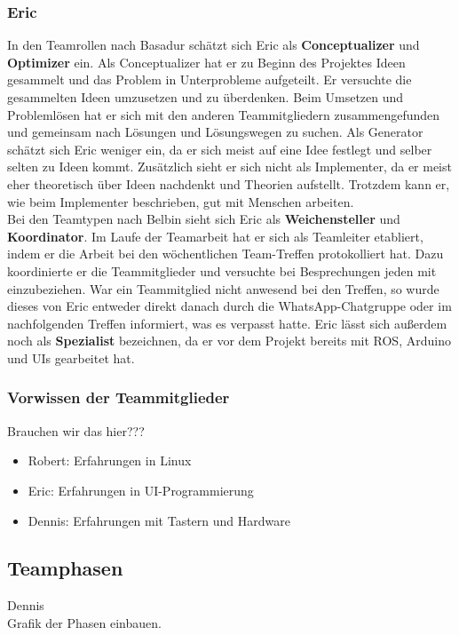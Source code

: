 \documentclass[a4paper,12pt,headsepline]{scrartcl}
\begin{document}
		\subsubsection{Eric}
		In den Teamrollen nach Basadur schätzt sich Eric als \textbf{Conceptualizer} und \textbf{Optimizer} ein. Als Conceptualizer hat er zu Beginn des Projektes Ideen gesammelt und das Problem in Unterprobleme aufgeteilt. Er versuchte die gesammelten Ideen umzusetzen und zu überdenken. Beim Umsetzen und Problemlösen hat er sich mit den anderen Teammitgliedern zusammengefunden und gemeinsam nach Lösungen und Lösungswegen zu suchen. Als Generator schätzt sich Eric weniger ein, da er sich meist auf eine Idee festlegt und selber selten zu Ideen kommt. Zusätzlich sieht er sich nicht als Implementer, da er meist eher theoretisch über Ideen nachdenkt und Theorien aufstellt. Trotzdem kann er, wie beim Implementer beschrieben, gut mit Menschen arbeiten.\\
		Bei den Teamtypen nach Belbin sieht sich Eric als \textbf{Weichensteller} und \textbf{Koordinator}. Im Laufe der Teamarbeit hat er sich als Teamleiter etabliert, indem er die Arbeit bei den wöchentlichen Team-Treffen protokolliert hat. Dazu koordinierte er die Teammitglieder und versuchte bei Besprechungen jeden mit einzubeziehen. War ein Teammitglied nicht anwesend bei den Treffen, so wurde dieses von Eric entweder direkt danach durch die WhatsApp-Chatgruppe oder im nachfolgenden Treffen informiert, was es verpasst hatte. Eric lässt sich außerdem noch als \textbf{Spezialist} bezeichnen, da er vor dem Projekt bereits mit ROS, Arduino und UIs gearbeitet hat.\\
		
	\subsubsection{Vorwissen der Teammitglieder}
		Brauchen wir das hier???
		\begin{itemize}
			\item Robert: Erfahrungen in Linux
			\item Eric: Erfahrungen in UI-Programmierung
			\item Dennis: Erfahrungen mit Tastern und Hardware
		\end{itemize}
	\subsection{Teamphasen}
		Dennis\\
		Grafik der Phasen einbauen.
\end{document}
